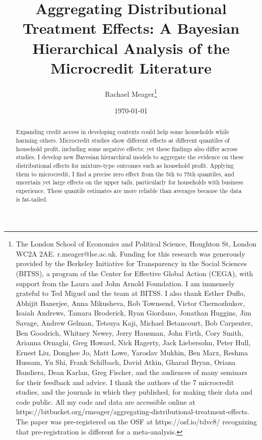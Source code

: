 \documentclass[AER]{AEA}
\begin{document}
\title{Aggregating Distributional Treatment Effects: A Bayesian Hierarchical Analysis of the Microcredit Literature}
\author{Rachael Meager\thanks{The London School of Economics and Political Science, Houghton St, London WC2A 2AE. r.meager@lse.ac.uk. Funding for this research was generously provided by the Berkeley Initiative for Transparency in the Social Sciences (BITSS), a program of the Center for Effective Global Action (CEGA), with support from the Laura and John Arnold Foundation. I am immensely grateful to Ted Miguel and the team at BITSS. I also thank Esther Duflo, Abhijit Banerjee, Anna Mikusheva, Rob Townsend, Victor Chernozhukov, Isaiah Andrews, Tamara Broderick, Ryan Giordano, Jonathan Huggins, Jim Savage, Andrew Gelman, Tetsuya Kaji, Michael Betancourt, Bob Carpenter, Ben Goodrich, Whitney Newey, Jerry Hausman, John Firth, Cory Smith, Arianna Ornaghi, Greg Howard, Nick Hagerty, Jack Liebersohn, Peter Hull, Ernest Liu, Donghee Jo, Matt Lowe, Yaroslav Mukhin, Ben Marx, Reshma Hussam, Yu Shi, Frank Schilbach, David Atkin, Gharad Bryan, Oriana Bandiera, Dean Karlan, Greg Fischer, and the audiences of many seminars for their feedback and advice. I thank the authors of the 7 microcredit studies, and the journals in which they published, for making their data and code public. All my code and data are accessible online at https://bitbucket.org/rmeager/aggregating-distributional-treatment-effects. The paper was pre-registered on the OSF at https://osf.io/tdvc8/ recognizing that pre-registration is different for a meta-analysis.}}
\date{\today}
\JEL{}
\Keywords{}

\begin{abstract}
Expanding credit access in developing contexts could help some households while harming others. Microcredit studies show different effects at different quantiles of household profit, including some negative effects; yet these findings also differ across studies. I develop new Bayesian hierarchical models to aggregate the evidence on these distributional effects for mixture-type outcomes such as household profit. Applying them to microcredit, I find a precise zero effect from the 5th to 75th quantiles, and uncertain yet large effects on the upper tails, particularly for households with business experience. These quantile estimates are more reliable than averages because the data is fat-tailed.
\end{abstract}
\end{document}

